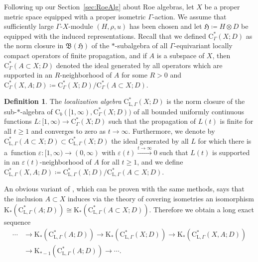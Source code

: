 \documentclass[11pt]{article}
\numberwithin{equation}{section}
\numberwithin{equation}{section}
\theoremstyle{definition}
\newtheorem{defn}[thm]{Definition}
\newcommand{\Ct}{\mathrm{C}}
\newcommand{\Cb}{\Ct_b}
\newcommand{\HilbertMod}{\mathfrak{H}}
\newcommand{\K}{\mathrm{K}}
\newcommand{\Roe}{\mathrm{C}^*}
\newcommand{\Loc}{\mathrm{C}^*_{\mathrm{L},\Gamma}}
\newcommand{\Lin}{{\mathfrak{B}}}
\begin{document}
Following up our Section~\ref{sec:RoeAlg} about Roe algebras, let $X$ be a proper metric space equipped with a proper isometric $\Gamma$-action. We assume that sufficiently large $\Gamma$-$X$-module $(H,\rho,u)$ has been chosen and let $\HilbertMod\coloneqq H\otimes D$ be equipped with the induced representations. Recall that we defined $\Roe_\Gamma(X;D)$ as the norm closure in $\Lin(\HilbertMod)$ of the $*$-subalgebra of all $\Gamma$-equivariant locally compact operators of finite propagation, and if $A$ is a subspace of $X$, then $\Roe_\Gamma(A\subset X;D)$ denoted the ideal generated by all operators which are supported in an $R$-neighborhood of $A$ for some $R>0$ and $\Roe_\Gamma(X,A;D)\coloneqq \Roe_\Gamma(X;D)/\Roe_\Gamma(A\subset X;D)$.


\begin{defn}
The \emph{localization algebra} $\Loc(X;D)$ is the norm closure of the sub-$*$-algebra of $\Cb([1,\infty),\Roe_\Gamma(X;D))$ of all bounded uniformly continuous functions $L\colon[1,\infty)\to\Roe_\Gamma(X;D)$ such that the propagation of $L(t)$ is finite for all $t\geq 1$ and converges to zero as $t\to\infty$. Furthermore, we denote by $\Loc(A\subset X;D)\subset \Loc(X;D)$ the ideal generated by all $L$ for which there is a~function $\varepsilon\colon[1,\infty)\to(0,\infty)$ with $\varepsilon(t)\xrightarrow{t\to\infty}0$ such that $L(t)$ is supported in an $\varepsilon(t)$-neighborhood of $A$ for all $t\geq 1$, and we define $\Loc(X,A;D)\coloneqq \Loc(X;D)/\Loc(A\subset X;D)$.
\end{defn}

An obvious variant of \cite[Lemma~6.3.6]{WillettYuHigherIndexTheory}, which can be proven with the same methods, says that the inclusion $A\subset X$ induces via the theory of covering isometries an isomorphism $\K_*(\Loc(A;D))\cong\K_*(\Loc(A\subset X;D))$. Therefore we obtain a long exact sequence
\begin{align}
\cdots&\to\K_*(\Loc(A;D))\to \K_*(\Loc(X;D))\to \K_*(\Loc(X,A;D))\nonumber
\\&\to \K_{*-1}(\Loc(A;D))\to\cdots.\label{eq:localizationLES}
\end{align}
\end{document}
